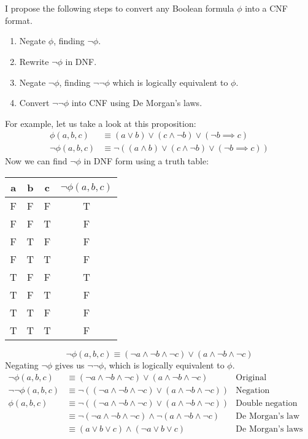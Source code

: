 \documentclass[draft]{article}
\begin{document}
\section{}
I propose the following steps to convert any Boolean formula $\phi$ into a CNF format.
\begin{enumerate}
    \item Negate $\phi$, finding $\neg \phi$.
    \item Rewrite $\neg \phi$ in DNF.
    \item Negate $\neg \phi$, finding $\neg \neg \phi$ which is logically equivalent to $\phi$.
    \item Convert $\neg \neg \phi$ into CNF using De Morgan's laws.
\end{enumerate}
For example, let us take a look at this proposition:
\begin{align*}
    \phi(a,b,c) & \equiv (a \lor b) \lor (c \land \neg b) \lor (\neg b \implies c) \\
    \neg \phi(a,b,c) & \equiv \neg ((a \land b) \lor (c \land \neg b) \lor (\neg b \implies c))
\end{align*}
Now we can find $\neg \phi$ in DNF form using a truth table:
\begin{table}[!h]
    \centering
    \begin{tabular}{ |c|c|c||c| }
        \hline
        a & b & c & $\neg \phi (a,b,c)$\\
        \hline
        F & F & F & T\\
        F & F & T & F\\
        F & T & F & F\\
        F & T & T & F\\
        T & F & F & T\\
        T & F & T & F\\
        T & T & F & F\\
        T & T & T & F\\
        \hline
    \end{tabular}
    \label{tab:notphitruth}
\end{table}
\begin{equation*}
    \neg \phi (a,b,c) \equiv (\neg a \land \neg b \land \neg c) \lor (a \land \neg b \land \neg c)
\end{equation*}
Negating $\neg \phi$ gives us $\neg \neg \phi$, which is logically equivalent to $\phi$.
\begin{align*}
    \neg \phi (a,b,c) & \equiv (\neg a \land \neg b \land \neg c) \lor (a \land \neg b \land \neg c) & \text{Original proposition} & \\
    \neg \neg \phi (a,b,c) & \equiv \neg ((\neg a \land \neg b \land \neg c) \lor (a \land \neg b \land \neg c)) & \text{Negation} & \\
    \phi (a,b,c) & \equiv \neg ((\neg a \land \neg b \land \neg c) \lor (a \land \neg b \land \neg c)) & \text{Double negation law} & \\
    & \equiv \neg (\neg a \land \neg b \land \neg c) \land \neg (a \land \neg b \land \neg c) & \text{De Morgan's law} & \\
    & \equiv (a \lor b \lor c) \land (\neg a \lor b \lor c) & \text{De Morgan's laws} &\\
\end{align*}
\end{document}
